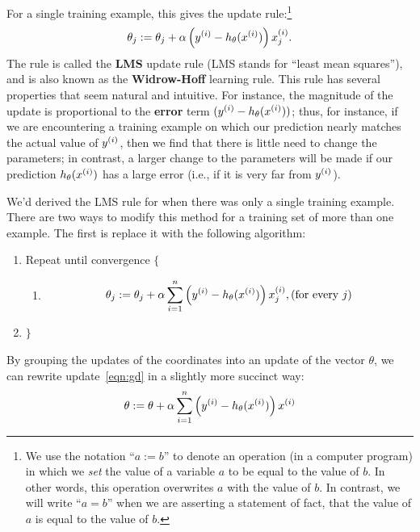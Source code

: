 \documentclass{article}
\begin{document}
For a single training example, this gives the update rule:\footnote{We use the
notation ``$a := b$'' to denote an operation (in a computer program) in
which we \emph{set} the value of a variable $a$ to be equal to the value of $b$.  In other
words, this operation overwrites $a$ with the value of $b$.  In contrast, we will
write ``$a = b$'' when we are asserting a statement of fact, that the value of $a$ is
equal to the value of $b$.}
\[
\theta_j := \theta_j + \alpha \left(\ysi - h_\theta(\xsi)\right) x^{(i)}_j.  %
\]
The rule is called the {\bf LMS} update rule (LMS stands for ``least mean squares''),
and is also known as the {\bf Widrow-Hoff} learning rule.
This rule has several properties that seem natural and intuitive. For instance, the
magnitude of the update is proportional to
the {\bf error} term
$({y^{(i)}} - h_\theta({x^{(i)}}))$; thus, for instance, if we are encountering a training
example on which our prediction nearly matches the actual value of ${y^{(i)}}$,
then we find that there is little need to change the parameters; in contrast,
a larger change to the parameters will be made if our prediction
$h_\theta({x^{(i)}})$ has a large error (i.e., if it is very far from ${y^{(i)}}$).

We'd derived the LMS rule for when there was only a single training example.  There are two
ways to modify this method for a training set of more than one example.  The first is
replace it with the following algorithm:
\begin{enumerate}
\item[] Repeat until convergence $\{$
\begin{enumerate}
\item[]\begin{align}\theta_j := \theta_j + \alpha \sum_{i=1}^{n} \left({y^{(i)}} - h_\theta({x^{(i)}})\right) x^{(i)}_j, \textup{(for every $j$)}\label{eqn:gd}\end{align}
\end{enumerate}
\item[] $\}$
\end{enumerate}

By grouping the updates of the coordinates into an update of the vector $\theta$, we can rewrite update~\eqref{eqn:gd} in a slightly more succinct way:
\begin{align}
\theta := \theta + \alpha \sum_{i=1}^{n} \left({y^{(i)}} - h_\theta({x^{(i)}})\right) x^{(i)} \nonumber
\end{align}
\end{document}

